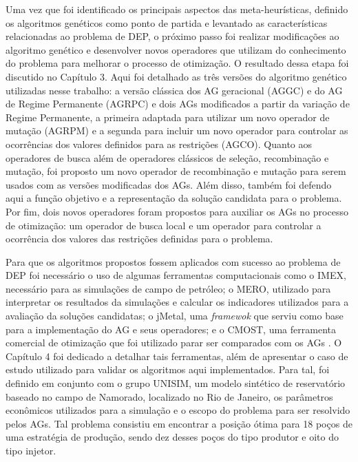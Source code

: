 Uma vez que foi identificado os principais aspectos das meta-heurísticas, definido os algoritmos genéticos como ponto de partida e levantado as características relacionadas ao problema de DEP, o próximo passo foi realizar modificações ao algoritmo genético e desenvolver novos operadores que utilizam do conhecimento do problema para melhorar o processo de otimização. O resultado dessa etapa foi discutido no Capítulo 3. Aqui foi detalhado as três versões do algoritmo genético utilizadas nesse trabalho: a versão clássica dos AG geracional (AGGC) e do AG de Regime Permanente (AGRPC) e dois AGs modificados a partir da variação de Regime Permanente, a primeira adaptada para utilizar um novo operador de mutação (AGRPM) e a segunda para incluir um novo operador para controlar as ocorrências dos valores definidos para as restrições (AGCO). Quanto aos operadores de busca além de operadores clássicos de seleção, recombinação e mutação, foi proposto um novo operador de recombinação e mutação para serem usados com as versões modificadas dos AGs. Além disso, também foi defendo aqui a função objetivo e a representação da solução candidata para o problema. Por fim, dois novos operadores foram propostos para auxiliar os AGs no processo de otimização: um operador de busca local e um operador para controlar a ocorrência dos valores das restrições definidas para o problema.

Para que os algoritmos propostos fossem aplicados com sucesso ao problema de DEP foi necessário o uso de algumas ferramentas computacionais como o IMEX, necessário para as simulações de campo de petróleo; o MERO, utilizado para interpretar os resultados da simulações e calcular os indicadores utilizados para a avaliação da soluções candidatas; o jMetal, uma \textit{framewok} que serviu como base para a implementação do AG e seus operadores; e o CMOST, uma ferramenta comercial de otimização que foi utilizado parar ser comparados com os AGs . O Capítulo 4 foi dedicado a detalhar tais ferramentas, além de apresentar o caso de estudo utilizado para validar os algoritmos aqui implementados. Para tal, foi definido em conjunto com o grupo UNISIM, um modelo sintético de reservatório baseado no campo de Namorado, localizado no Rio de Janeiro, os parâmetros econômicos utilizados para a simulação e o escopo do problema para ser resolvido pelos AGs. Tal problema consistiu em encontrar a posição ótima para 18 poços de uma estratégia de produção, sendo dez desses poços do tipo produtor e oito do tipo injetor.

